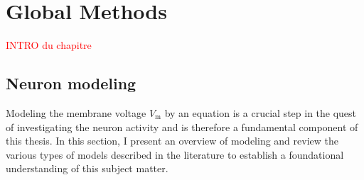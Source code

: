 \chapter{Global Methods}
\color{black}

%
%

\textcolor{red}{INTRO du chapitre}


\section{Neuron modeling}
Modeling the membrane voltage $V_\mathrm{m}$ by an equation is a crucial step in the quest of investigating the neuron activity and is therefore a fundamental component of this thesis. In this section, I present an overview of modeling and review the various types of models described in the literature to establish a foundational understanding of this subject matter.




